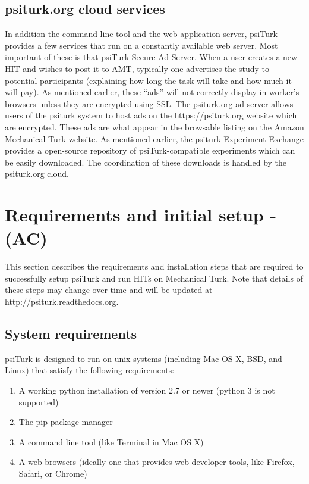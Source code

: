 \documentclass[twocolumn]{svjour3}          %
\begin{document}
\subsection{\textsf{psiturk.org} cloud services}
In addition the command-line tool and the web application server, \textsf{psiTurk}
provides a few services that run on a constantly available web server.
Most important of these is that psiTurk Secure Ad Server.  When a user
creates a new HIT and wishes to post it to AMT, typically one advertises the
study to potential participants (explaining how long the task will take and how
much it will pay).  As mentioned earlier, these ``ads'' will not correctly display
in worker's browsers unless they are encrypted using SSL.  The \textsf{psiturk.org}
ad server allows users of the psiturk system to host ads on the \textsf{https://psiturk.org}
website which are encrypted.  These ads are what appear in the browsable listing
on the Amazon Mechanical Turk website.
As mentioned earlier, the psiturk Experiment Exchange provides
a open-source repository of \textsf{psiTurk}-compatible experiments which can be 
easily downloaded.  The coordination of these downloads is handled by the \textsf{psiturk.org} cloud.


\section{Requirements and initial setup - (AC)}
This section describes the requirements and installation steps that are required to successfully setup psiTurk and run
HITs on Mechanical Turk. Note that details of these steps may change over time and will be updated at \textsf{http://psiturk.readthedocs.org}.

\subsection{System requirements}
psiTurk is designed to run on unix systems (including Mac OS X, BSD, and Linux) that satisfy the following requirements:

\begin{enumerate}
\item A working python installation of version 2.7 or newer (python 3 is not supported)
\item The pip package manager 
\item A command line tool (like Terminal in Mac OS X)
\item A web browsers (ideally one that provides web developer tools, like Firefox, Safari, or Chrome)
\end{enumerate}
\end{document}
